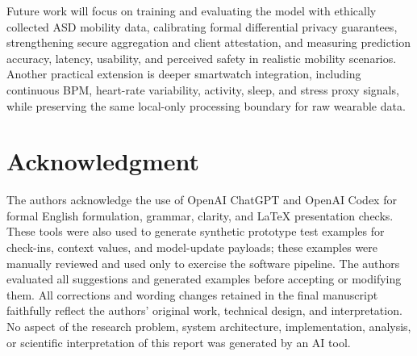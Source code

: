 \documentclass[lettersize,journal]{IEEEtran}
\begin{document}
Future work will focus on training and evaluating the model with
ethically collected ASD mobility data, calibrating formal differential
privacy guarantees, strengthening secure aggregation and client
attestation, and measuring prediction accuracy, latency, usability, and
perceived safety in realistic mobility scenarios. Another practical
extension is deeper smartwatch integration, including continuous BPM,
heart-rate variability, activity, sleep, and stress proxy signals, while
preserving the same local-only processing boundary for raw wearable
data.


\section*{Acknowledgment}

The authors acknowledge the use of OpenAI ChatGPT and OpenAI Codex for
formal English formulation, grammar, clarity, and LaTeX presentation
checks. These tools were also used to generate synthetic prototype test
examples for check-ins, context values, and model-update payloads; these
examples were manually reviewed and used only to exercise the software
pipeline. The authors evaluated all suggestions and generated examples
before accepting or modifying them. All corrections and wording changes
retained in the final manuscript faithfully reflect the authors'
original work, technical design, and interpretation. No aspect of the
research problem, system architecture, implementation, analysis, or
scientific interpretation of this report was generated by an AI tool.
\end{document}
